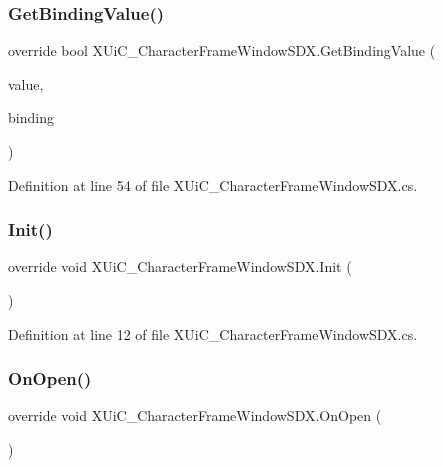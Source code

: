 \subsubsection{\texorpdfstring{GetBindingValue()}{GetBindingValue()}}
{\footnotesize\ttfamily override bool X\+Ui\+C\+\_\+\+Character\+Frame\+Window\+S\+D\+X.\+Get\+Binding\+Value (\begin{DoxyParamCaption}\item[{ref string}]{value,  }\item[{Binding\+Item}]{binding }\end{DoxyParamCaption})}



Definition at line 54 of file X\+Ui\+C\+\_\+\+Character\+Frame\+Window\+S\+D\+X.\+cs.

\mbox{\label{class_x_ui_c___character_frame_window_s_d_x_a5adbffd6a1624cc71b92fa1430fbd325}} 
\subsubsection{\texorpdfstring{Init()}{Init()}}
{\footnotesize\ttfamily override void X\+Ui\+C\+\_\+\+Character\+Frame\+Window\+S\+D\+X.\+Init (\begin{DoxyParamCaption}{ }\end{DoxyParamCaption})}



Definition at line 12 of file X\+Ui\+C\+\_\+\+Character\+Frame\+Window\+S\+D\+X.\+cs.

\mbox{\label{class_x_ui_c___character_frame_window_s_d_x_ade8c88125fd81efcf5f2cd2441bec993}} 
\subsubsection{\texorpdfstring{OnOpen()}{OnOpen()}}
{\footnotesize\ttfamily override void X\+Ui\+C\+\_\+\+Character\+Frame\+Window\+S\+D\+X.\+On\+Open (\begin{DoxyParamCaption}{ }\end{DoxyParamCaption})}



